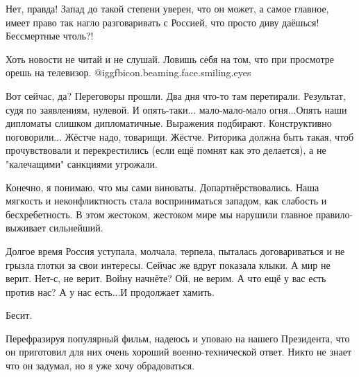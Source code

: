 Нет, правда! Запад до такой степени уверен, что он может, а самое главное,
имеет право так нагло разговаривать с Россией, что просто диву даёшься!
Бессмертные чтоль?!

Хоть новости не читай и не слушай. Ловишь себя на том, что при просмотре орешь
на телевизор. @igg{fbicon.beaming.face.smiling.eyes} 

Вот сейчас, да? Переговоры прошли. Два дня что-то там перетирали. Результат,
судя по заявлениям, нулевой. И опять-таки... мало-мало-мало огня...Опять наши
дипломаты слишком дипломатичные. Выражения подбирают. Конструктивно
поговорили... Жёстче надо, товарищи. Жёстче. Риторика должна быть такая, чтоб
прочувствовали и перекрестились (если ещё помнят как это делается), а не
"калечащими" санкциями угрожали.

Конечно, я понимаю, что мы сами виноваты. Допартнёрствовались. Наша мягкость и
неконфликтность стала восприниматься западом, как слабость и бесхребетность. В
этом жестоком, жестоком мире мы нарушили главное правило- выживает сильнейший.

Долгое время Россия уступала, молчала, терпела, пыталась договариваться и не
грызла глотки за свои интересы. Сейчас же вдруг показала клыки. А мир не верит.
Нет-с, не верит. Войну начнёте? Ой, не верим. А что ещё у вас есть против нас?
А у нас есть...И продолжает хамить.

Бесит.

Перефразируя популярный фильм, надеюсь и уповаю на нашего Президента, что он
приготовил для них очень хороший военно-технической ответ. Никто не знает что
он задумал, но я уже хочу обрадоваться.

